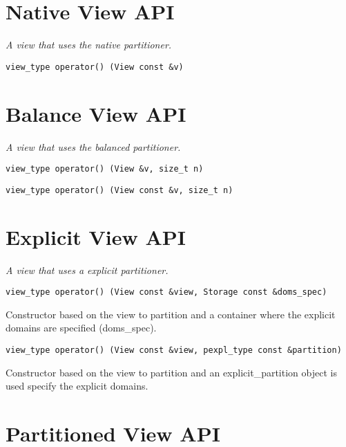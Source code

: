 \pagebreak

\section{Native View API } \label{sec-nat-vw}

\emph{ A view that uses the native partitioner. }

\begin{verbatim}
view_type operator() (View const &v)
\end{verbatim}

\section{Balance View API } \label{sec-bal-vw}

\emph{ A view that uses the balanced partitioner. }

\begin{verbatim}
view_type operator() (View &v, size_t n)
\end{verbatim}

\begin{verbatim}
view_type operator() (View const &v, size_t n)
\end{verbatim}

\section{Explicit View API } \label{sec-expl-vw}

\emph{ A view that uses a explicit partitioner.}

\begin{verbatim}
view_type operator() (View const &view, Storage const &doms_spec)
\end{verbatim}

Constructor based on the view to partition and a container where the explicit domains are specified (doms\_spec).

\begin{verbatim}
view_type operator() (View const &view, pexpl_type const &partition)
\end{verbatim}

Constructor based on the view to partition and an explicit\_partition object is used specify the explicit domains.

\section{Partitioned View API } \label{sec-part-vw}

